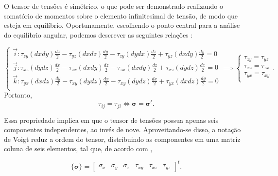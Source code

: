 O tensor de tensões é simétrico, o que pode ser demonstrado realizando o somatório de momentos sobre o elemento infinitesimal de tensão, de modo que esteja em equilíbrio. Oportunamente, escolhendo o ponto central para a análise do equilíbrio angular, podemos descrever as seguintes relações \cite[pág. 8]{popov}:

\begin{equation}
    \begin{cases}
        \displaystyle  \vec{i} : \tau_{zy} (dxdy) \frac{dz}{2} - \tau_{yz} (dx dz) \frac{dy}{2} - \tau_{zy} (dydx) \frac{dz}{2}+ \tau_{yz} (dxdy) \frac{dy}{2} = 0 \\

        \displaystyle  \vec{j} : \tau_{xz} (dydz) \frac{dx}{2} - \tau_{zx} (dx dy) \frac{dz}{2} - \tau_{zx} (dx dy) \frac{dz}{2} + \tau_{xz} (dydz) \frac{dx}{2} = 0 \\

        
        \displaystyle  \vec{k} : \tau_{yx} (dxdz) \frac{dy}{2} - \tau_{xy} (dydz) \frac{dx}{2} - \tau_{xy} (dydz) \frac{dx}{2} + \tau_{yx} (dxdz) \frac{dy}{2} = 0 \\

    \end{cases} \implies
    \begin{cases}
        \tau_{zy} = \tau_{yz} \\
        \tau_{xz} = \tau_{zx} \\
        \tau_{yx} = \tau_{xy} \\
    \end{cases}.
\end{equation}
Portanto,
\begin{equation}
    \tau_{ij} = \tau_{ji} \iff \bm{\sigma} = \bm{\sigma}^t.
\end{equation}

Essa propriedade implica em que o tensor de tensões possua apenas seis componentes independentes, ao invés de nove. Aproveitando-se disso, a notação de Voigt reduz a ordem do tensor, distribuindo as componentes em uma matriz coluna de seis elementos, tal que, de acordo com ,

\begin{equation}
    \{\bm{\sigma}\} = \begin{bmatrix}
        \sigma_x & \sigma_y & \sigma_z & \tau_{xy} & \tau_{xz} & \tau_{yz}
    \end{bmatrix}^t.
\end{equation}


